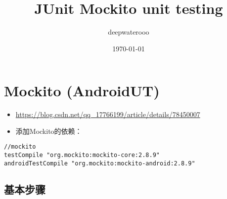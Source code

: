 \documentclass[9pt, b5paper]{article}
\author{deepwaterooo}
\date{\today}
\title{JUnit Mockito unit testing}
\begin{document}
\maketitle
\tableofcontents


\section{Mockito (AndroidUT)}
\label{sec-1}
\begin{itemize}
\item \url{https://blog.csdn.net/qq_17766199/article/details/78450007}
\item 添加Mockito的依赖：
\end{itemize}
\begin{verbatim}
//mockito
testCompile "org.mockito:mockito-core:2.8.9"
androidTestCompile "org.mockito:mockito-android:2.8.9"
\end{verbatim}
\subsection{基本步骤}
\label{sec-1-1}
\end{document}
